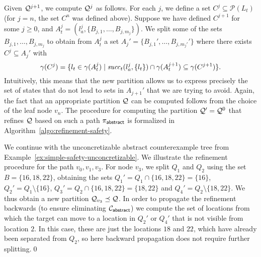 Given $\mathcal{Q}^{j+1}$, we compute $\mathcal{Q}^j$ as follows. For each $j$, we define a set $C^j \subseteq \mathcal{P}(L_t)$ (for $j=n$, the set $C^n$ was defined above). Suppose we have defined $C^{j+1}$ for some $j \geq 0$, and $A_t^j = (l_a^j,\{B_{j,1},\ldots,B_{j,m_j}\})$. We split some of the sets $B_{j,1},\ldots,B_{j,m_j}$ to obtain from $A_t^j$ a set $A_j' = \{B_{j,1}',\ldots,B_{j,m_j'}'\}$ where there exists $C^j \subseteq A_j'$ with
\[\gamma(C^j) = \{l_t \in \gamma(A_t^j) \mid \mathit{succ}_t(l_a^j,\{l_t\}) \cap \gamma(A_t^{j+1}) \subseteq \gamma(C^{j+1})\}.\] 
Intuitively, this means that the new partition allows us to express precisely the set of states that do not lead to sets in $A_{j+1}'$ that we are trying to avoid. 
Again, the fact that an appropriate partition $\mathcal{Q}$ can be computed follows from the choice of the leaf node $v_n$. 
The procedure for computing the partition $\mathcal{Q}' = \mathcal{Q}^0$ that refines $\mathcal{Q}$ based on such a path $\pi_{\mathsf{abstract}}$ is formalized in Algorithm~\ref{algo:refinement-safety}.
\begin{example}
We continue with the unconcretizable abstract counterexample tree from Example~\ref{ex:simple-safety-unconcretizable}. We illustrate the refinement procedure for the path $v_0,v_1,v_3$. For node $v_3$, we split $Q_1$ and $Q_2$ using the set $B = \{16,18,22\}$, obtaining the sets $Q_1' = Q_1 \cap \{16,18,22\} = \{16\}$, $Q_2' = Q_1\setminus\{16\}$, $Q_3' = Q_2 \cap \{16,18,22\} = \{18,22\}$ and $Q_4' = Q_2 \setminus \{18,22\}$. We thus obtain a new partition $\mathcal{Q}_{v_3} \preceq \mathcal{Q}$. In order to propagate the refinement backwards (to ensure eliminating $\mathcal{C}_{\mathsf{abstract}}$) we compute the set of locations from which the target can move to a location in $Q_2'$ or $Q_4'$ that is not visible from location $2$. In this case, these are just the locations $18$ and $22$, which have already been separated from $Q_2$, so here backward propagation does not require further splitting.\qed
\end{example}


